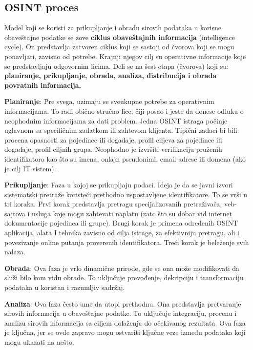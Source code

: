\documentclass[a4paper, 11pt]{article}
\begin{document}
\subsection{OSINT proces}
Model koji se koristi za prikupljanje i obradu sirovih podataka u korisne obaveštajne podatke se zove {\bf ciklus obaveštajnih informacija} (intelligence cycle). On predstavlja zatvoren ciklus koji se sastoji od čvorova koji se mogu ponavljati, zavisno od potrebe. Krajnji njegov cilj su operativne informacije koje se predstavljaju odgovornim licima. Deli se na šest etapa (čvorova) koji su: {\bf planiranje, prikupljanje, obrada, analiza, distribucija i obrada povratnih informacija.}\newline

{\bf Planiranje}: Pre svega, uzimaju se sveukupne potrebe za operativnim informacijama. To radi obično stručno lice, čiji posao i jeste da donese odluku o neophodnim informacijama za dati problem. Jedna OSINT istraga počinje uglavnom sa specifičnim zadatkom ili zahtevom klijenta. Tipični zadaci bi bili: procena opasnosti za pojedince ili događaje, profil ciljeva za pojedince ili događaje, profil ciljnih grupa. Neophodno je izvršiti verifikaciju pruženih identifikatora kao što su imena, onlajn pseudonimi, email adrese ili domena (ako je cilj IT sistem).\newline

{\bf Prikupljanje}: Faza u kojoj se prikupljaju podaci. Ideja je da se javni izvori sistematski pretraže koristeći prethodno uspostavljene identifikatore. To se vrši u tri koraka. Prvi korak predstavlja pretragu specijalizovanih pretraživača, veb-sajtova i usluga koje mogu zahtevati naplatu (zato što su dobar vid internet dokumentacije pojedinca ili grupe). Drugi korak je primena određenih OSINT aplikacija, alata I tehnika zavisno od cilja istrage, za efektivniju pretragu, ali i povezivanje online putanja proverenih identifikatora. Treći korak je beleženje svih nalaza.\newline

{\bf Obrada}: Ova faza je vrlo dinamične prirode, gde se ona može modifikovati da služi bilo kom vidu obrade. To uključuje prevođenje, dekripciju i transformaciju podataka u koristan i razumljiv sadržaj.\newline

{\bf Analiza}: Ova faza često ume da utopi prethodnu. Ona predstavlja pretvaranje sirovih informacija u obaveštajne podatke. To uključuje integraciju, procenu i analizu sirovih informacija sa ciljem dolaženja do očekivanog rezultata. Ova faza je ključna, jer se ovde zapravo mogu ostvariti ključne veze između podataka koji mogu ukazati na nešto.\newline
\end{document}

